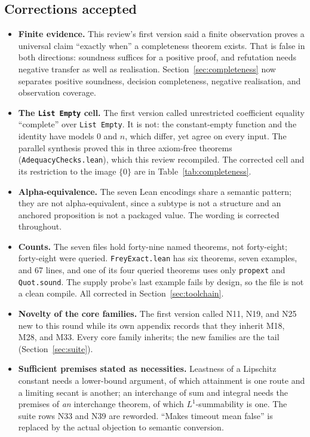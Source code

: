 \documentclass[11pt,a4paper]{article}
\newcommand{\code}[1]{\nolinkurl{#1}}
\theoremstyle{definition}
\begin{document}
\subsection{Corrections accepted}
\begin{itemize}
\item \textbf{Finite evidence.} This review's first version said a finite observation proves a universal claim ``exactly when'' a completeness theorem exists. That is false in both directions: soundness suffices for a positive proof, and refutation needs negative transfer as well as realisation. Section~\ref{sec:completeness} now separates positive soundness, decision completeness, negative realisation, and observation coverage.
\item \textbf{The \code{List Empty} cell.} The first version called unrestricted coefficient equality ``complete'' over \code{List Empty}. It is not: the constant-empty function and the identity have models $0$ and $n$, which differ, yet agree on every input. The parallel synthesis proved this in three axiom-free theorems (\code{AdequacyChecks.lean}), which this review recompiled. The corrected cell and its restriction to the image $\{0\}$ are in Table~\ref{tab:completeness}.
\item \textbf{Alpha-equivalence.} The seven Lean encodings share a semantic pattern; they are not alpha-equivalent, since a subtype is not a structure and an anchored proposition is not a packaged value. The wording is corrected throughout.
\item \textbf{Counts.} The seven files hold forty-nine named theorems, not forty-eight; forty-eight were queried. \code{FreyExact.lean} has six theorems, seven examples, and 67 lines, and one of its four queried theorems uses only \code{propext} and \code{Quot.sound}. The supply probe's last example fails by design, so the file is not a clean compile. All corrected in Section~\ref{sec:toolchain}.
\item \textbf{Novelty of the core families.} The first version called N11, N19, and N25 new to this round while its own appendix records that they inherit M18, M28, and M33. Every core family inherits; the new families are the tail (Section~\ref{sec:suite}).
\item \textbf{Sufficient premises stated as necessities.} Leastness of a Lipschitz constant needs a lower-bound argument, of which attainment is one route and a limiting secant is another; an interchange of sum and integral needs the premises of \emph{an} interchange theorem, of which $L^1$-summability is one. The suite rows N33 and N39 are reworded. ``Makes timeout mean false'' is replaced by the actual objection to semantic conversion.

\end{itemize}
\end{document}

